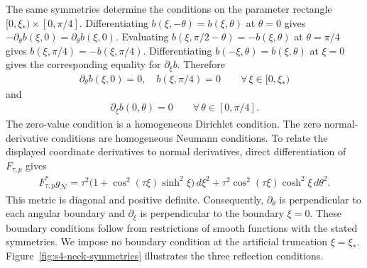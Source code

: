 \documentclass[a4paper,11pt,oneside,reqno]{amsart}
\numberwithin{equation}{section}
\theoremstyle{definition}
\begin{document}
The same symmetries determine the conditions on the
parameter rectangle $[0,\xi_*)\times[0,\pi/4]$.
Differentiating $b(\xi,-\theta)=b(\xi,\theta)$ at
$\theta=0$ gives
$-\partial_\theta b(\xi,0)=\partial_\theta b(\xi,0)$.
Evaluating
$b(\xi,\pi/2-\theta)=-b(\xi,\theta)$ at $\theta=\pi/4$
gives $b(\xi,\pi/4)=-b(\xi,\pi/4)$.
Differentiating $b(-\xi,\theta)=b(\xi,\theta)$ at
$\xi=0$ gives the corresponding equality for
$\partial_\xi b$. Therefore
%
\begin{align*}
    \partial_\theta b(\xi,0)=0, \quad b(\xi,\pi/4)=0 \qquad \forall\,\xi\in[0,\xi_*)
\end{align*}
%
and
%
\begin{align*}
    \partial_\xi b(0,\theta)=0 \qquad\forall\,\theta\in[0,\pi/4].
\end{align*}
%
The zero-value condition is a homogeneous Dirichlet
condition. The zero normal-derivative conditions are
homogeneous Neumann conditions. To relate the displayed
coordinate derivatives to normal derivatives, direct
differentiation of $F_{\tau,p}$ gives
%
\begin{align*}
    F_{\tau,p}^*g_{\mathcal N}
    =
    \tau^2\bigl(1+\cos^2(\tau\xi)\sinh^2\xi\bigr)\,d\xi^2
    +
    \tau^2\cos^2(\tau\xi)\cosh^2\xi\,d\theta^2.
\end{align*}
%
This metric is diagonal and positive definite.
Consequently, $\partial_\theta$ is perpendicular to
each angular boundary and $\partial_\xi$ is perpendicular
to the boundary $\xi=0$. These boundary conditions
follow from restrictions of smooth functions with the
stated symmetries. We impose no boundary condition at
the artificial truncation $\xi=\xi_*$.
Figure~\ref{fig:s4-neck-symmetries} illustrates the
three reflection conditions.
\end{document}
